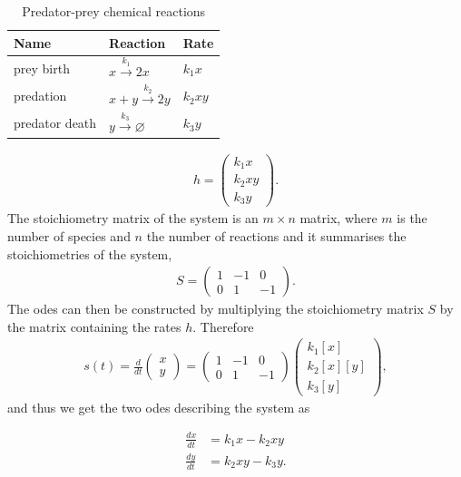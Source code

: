 \begin{table}[h]
\centering
\caption{Predator-prey chemical reactions}
\label{tab:pp_reac}
\begin{tabular}{@{}lll@{}}
\toprule
Name & Reaction & Rate \\ \midrule
prey birth & $x \xrightarrow{k_1} 2x$ & $k_{1}x$ \\
predation & $x + y \xrightarrow{k_2} 2y$ & $k_{2}xy$ \\
predator death & $y \xrightarrow{k_3} \varnothing$ & $k_{3}y$ \\ \bottomrule
\end{tabular}
\end{table}

\begin{align*}
h = 
\begin{pmatrix}
	k_{1}x \\
	 k_{2}xy \\
	 k_{3}y 
\end{pmatrix}.
\end{align*}
The stoichiometry matrix of the system is an $m\times n$ matrix, where $m$ is the number of species and $n$ the number of reactions and it summarises the stoichiometries of the system, 
\begin{align}
S = \begin{pmatrix}
	1 & -1& 0\\
	0&1&-1 
\end{pmatrix}.
\end{align}
The \acrshort{ode}s can then be constructed by multiplying the stoichiometry matrix $S$ by the matrix containing the rates $h$. Therefore
\begin{align}
s(t) = \frac{d}{dt}\begin{pmatrix}
x\\
y 
\end{pmatrix} = \begin{pmatrix}
1 &-1  &0 \\ 
 0&1  &-1 
\end{pmatrix}\begin{pmatrix}
k_1[x]\\
k_2[x][y]\\
k_3[y] 
\end{pmatrix},
\end{align}
and thus we get the two \acrshort{ode}s describing the system as

\begin{align}
\frac{dx}{dt} &= k_1x - k_2xy\\ \label{eq:predator-prey}
\frac{dy}{dt} &= k_2xy - k_3y.
\end{align}


